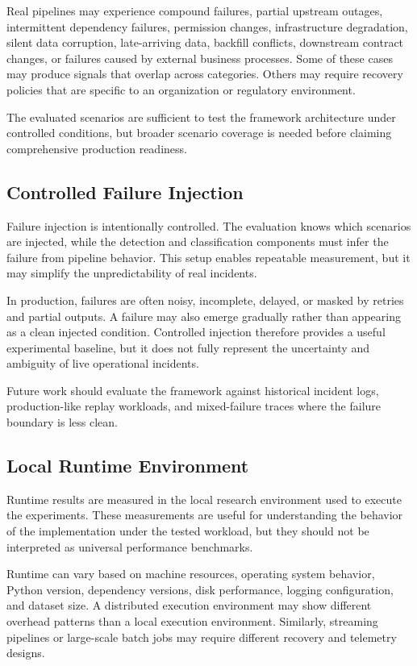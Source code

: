 Real pipelines may experience compound failures, partial upstream outages, intermittent dependency failures, permission changes, infrastructure degradation, silent data corruption, late-arriving data, backfill conflicts, downstream contract changes, or failures caused by external business processes. Some of these cases may produce signals that overlap across categories. Others may require recovery policies that are specific to an organization or regulatory environment.

The evaluated scenarios are sufficient to test the framework architecture under controlled conditions, but broader scenario coverage is needed before claiming comprehensive production readiness.

\subsection{Controlled Failure Injection}

Failure injection is intentionally controlled. The evaluation knows which scenarios are injected, while the detection and classification components must infer the failure from pipeline behavior. This setup enables repeatable measurement, but it may simplify the unpredictability of real incidents.

In production, failures are often noisy, incomplete, delayed, or masked by retries and partial outputs. A failure may also emerge gradually rather than appearing as a clean injected condition. Controlled injection therefore provides a useful experimental baseline, but it does not fully represent the uncertainty and ambiguity of live operational incidents.

Future work should evaluate the framework against historical incident logs, production-like replay workloads, and mixed-failure traces where the failure boundary is less clean.

\subsection{Local Runtime Environment}

Runtime results are measured in the local research environment used to execute the experiments. These measurements are useful for understanding the behavior of the implementation under the tested workload, but they should not be interpreted as universal performance benchmarks.

Runtime can vary based on machine resources, operating system behavior, Python version, dependency versions, disk performance, logging configuration, and dataset size. A distributed execution environment may show different overhead patterns than a local execution environment. Similarly, streaming pipelines or large-scale batch jobs may require different recovery and telemetry designs.

